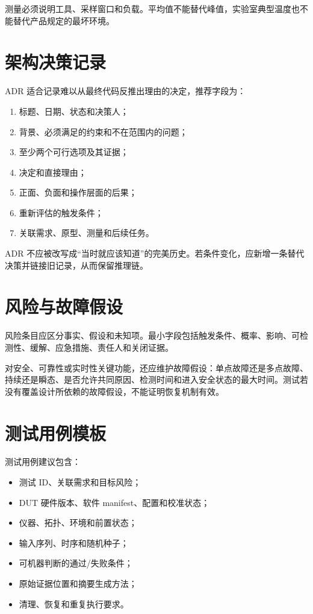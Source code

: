 测量必须说明工具、采样窗口和负载。平均值不能替代峰值，实验室典型温度也不能替代产品规定的最坏环境。

\section{架构决策记录}

ADR 适合记录难以从最终代码反推出理由的决定，推荐字段为：
\begin{enumerate}
  \item 标题、日期、状态和决策人；
  \item 背景、必须满足的约束和不在范围内的问题；
  \item 至少两个可行选项及其证据；
  \item 决定和直接理由；
  \item 正面、负面和操作层面的后果；
  \item 重新评估的触发条件；
  \item 关联需求、原型、测量和后续任务。
\end{enumerate}

ADR 不应被改写成“当时就应该知道”的完美历史。若条件变化，应新增一条替代决策并链接旧记录，从而保留推理链。

\section{风险与故障假设}

风险条目应区分事实、假设和未知项。最小字段包括触发条件、概率、影响、可检测性、缓解、应急措施、责任人和关闭证据。

对安全、可靠性或实时性关键功能，还应维护故障假设：单点故障还是多点故障、持续还是瞬态、是否允许共同原因、检测时间和进入安全状态的最大时间。测试若没有覆盖设计所依赖的故障假设，不能证明恢复机制有效。

\section{测试用例模板}

测试用例建议包含：
\begin{itemize}
  \item 测试 ID、关联需求和目标风险；
  \item DUT 硬件版本、软件 manifest、配置和校准状态；
  \item 仪器、拓扑、环境和前置状态；
  \item 输入序列、时序和随机种子；
  \item 可机器判断的通过/失败条件；
  \item 原始证据位置和摘要生成方法；
  \item 清理、恢复和重复执行要求。
\end{itemize}

